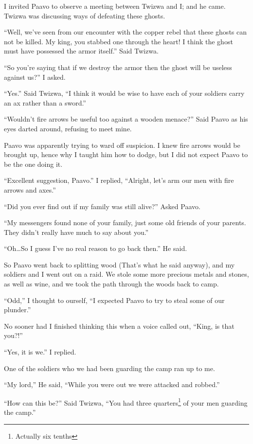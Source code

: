 \tbreak

I invited Paavo to observe a meeting between Twizwa and I; and he came. Twizwa was discussing ways of defeating these ghosts.

``Well, we've seen from our encounter with the copper rebel that these ghosts can not be killed. My king, you stabbed one through the heart! I think the ghost must have possessed the armor itself.'' Said Twizwa.

``So you're saying that if we destroy the armor then the ghost will be useless against us?'' I asked.

``Yes.'' Said Twizwa, ``I think it would be wise to have each of your soldiers carry an ax rather than a sword.''

``Wouldn't fire arrows be useful too against a wooden menace?'' Said Paavo as his eyes darted around, refusing to meet mine.

Paavo was apparently trying to ward off suspicion. I knew fire arrows would be brought up, hence why I taught him how to dodge, but I did not expect Paavo to be the one doing it.

``Excellent suggestion, Paavo.'' I replied, ``Alright, let's arm our men with fire arrows and axes.''

``Did you ever find out if my family was still alive?'' Asked Paavo.

``My messengers found none of your family, just some old friends of your parents. They didn't really have much to say about you.''

``Oh\ldots So I guess I've no real reason to go back then.'' He said.

So Paavo went back to splitting wood (That's what he said anyway), and my soldiers and I went out on a raid.
We stole some more precious metals and stones, as well as wine, and we took the path through the woods back to camp.

``Odd,'' I thought to ourself, ``I expected Paavo to try to steal some of our plunder.''

No sooner had I finished thinking this when a voice called out, ``King, is that you?!''

``Yes, it is we.'' I replied.

One of the soldiers who we had been guarding the camp ran up to me.

``My lord,'' He said, ``While you were out we were attacked and robbed.''

``How can this be?'' Said Twizwa, ``You had three quarters\footnote{Actually six tenths} of your men guarding the camp.''

